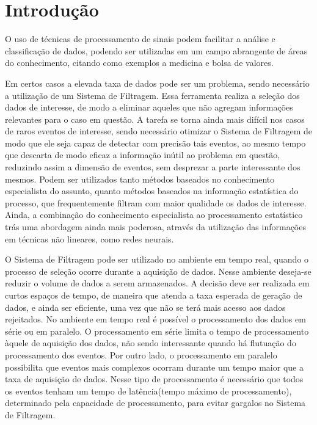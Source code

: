 \chapter{Introdução}

O uso de técnicas de processamento de sinais podem facilitar a análise e
classificação de dados, podendo ser utilizadas em um campo abrangente de áreas
do conhecimento, citando como exemplos a medicina e bolsa de valores.

Em certos casos a elevada taxa de dados pode ser um problema, sendo necessário a
utilização de um Sistema de Filtragem. Essa ferramenta realiza a seleção dos dados 
de interesse, de modo a eliminar aqueles que não agregam informações relevantes 
para o caso em questão. A tarefa se torna ainda mais difícil nos casos de raros
eventos de interesse, sendo necessário otimizar o Sistema de Filtragem de modo que 
ele seja capaz de detectar com precisão tais eventos, ao mesmo tempo que descarta 
de modo eficaz a informação inútil ao problema em questão, reduzindo assim a dimensão 
de eventos, sem desprezar a parte interessante dos mesmos.
Podem ser utilizados tanto métodos baseados no conhecimento especialista do
assunto, quanto métodos baseados na informação estatística do processo, 
que frequentemente filtram com maior qualidade os dados de interesse. Ainda, 
a combinação do conhecimento especialista ao processamento 
estatístico trás uma abordagem ainda mais poderosa, através da utilização das informações 
em técnicas não lineares, como redes neurais.

O Sistema de Filtragem pode ser utilizado no ambiente em tempo real,
quando o processo de seleção ocorre durante a aquisição de dados. Nesse ambiente
deseja-se reduzir o volume de dados a serem armazenados. A decisão deve ser realizada 
em curtos espaços de tempo, de maneira que atenda a taxa esperada de geração de
dados, e ainda ser eficiente, uma vez que não se terá mais acesso aos dados
rejeitados. No ambiente em tempo real é possível o processamento dos dados em série
ou em paralelo. O processamento em série limita o tempo de processamento àquele
de aquisição dos dados, não sendo interessante quando há flutuação do
processamento dos eventos. Por outro lado, o processamento em
paralelo possibilita que eventos mais complexos ocorram durante um tempo maior
que a taxa de aquisição de dados. Nesse tipo de processamento é necessário que
todos os eventos tenham um tempo de latência(tempo máximo de processamento), determinado pela capacidade
de processamento, para evitar gargalos no Sistema de Filtragem.

